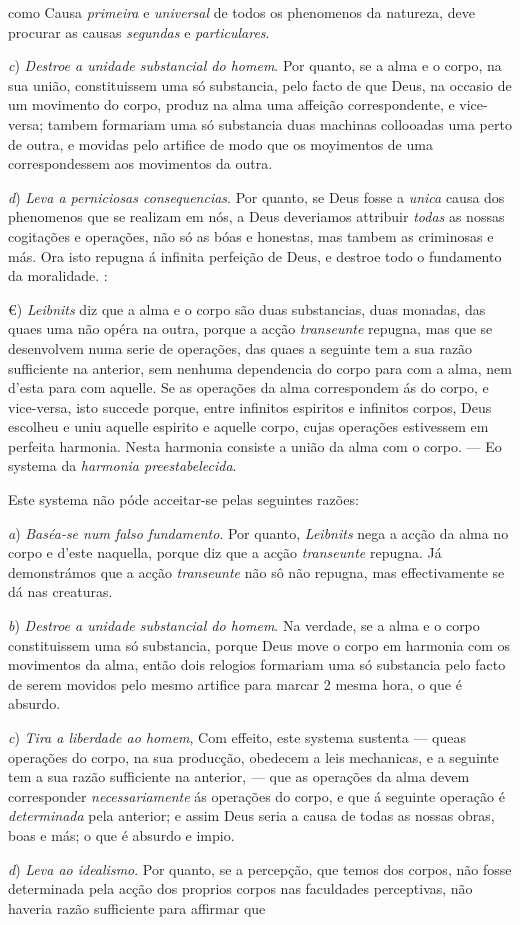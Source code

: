 como Causa \emph{primeira} e \emph{universal} de todos os phenomenos da natureza, deve procurar as causas \emph{segundas} e \emph{particulares}.\par \emph{c}) \emph{Destroe a unidade substancial do homem}. Por quanto, se a alma e o corpo, na sua união, constituissem uma só substancia, pelo facto de que Deus, na occasio de um movimento do corpo, produz na alma uma affeição correspondente, e vice-versa; tambem formariam uma só substancia duas machinas collooadas uma perto de outra, e movidas pelo artifice de modo que os moyimentos de uma correspondessem aos movimentos da outra.\par \emph{d}) \emph{Leva a perniciosas consequencias}. Por quanto, se Deus fosse a \emph{unica} causa dos phenomenos que se realizam em nós, a Deus deveriamos attribuir \emph{todas} as nossas cogitações e operações, não só as bóas e honestas, mas tambem as criminosas e más. Ora isto repugna á infinita perfeição de Deus, e destroe todo o fundamento da moralidade. :\par €) \emph{Leibnits} diz que a alma e o corpo são duas substancias, duas monadas, das quaes uma não opéra na outra, porque a acção \emph{transeunte} repugna, mas que se desenvolvem numa serie de operações, das quaes a seguinte tem a sua razão sufficiente na anterior, sem nenhuma dependencia do corpo para com a alma, nem d'esta para com aquelle. Se as operações da alma correspondem ás do corpo, e vice-versa, isto succede porque, entre infinitos espiritos e infinitos corpos, Deus escolheu e uniu aquelle espirito e aquelle corpo, cujas operações estivessem em perfeita harmonia. Nesta harmonia consiste a união da alma com o corpo. --- Eo systema da \emph{harmonia preestabelecida}.\par Este systema não póde acceitar-se pelas seguintes razões:\par \emph{a}) \emph{Baséa-se num falso fundamento}. Por quanto, \emph{Leibnits} nega a acção da alma no corpo e d'este naquella, porque diz que a acção \emph{transeunte} repugna. Já demonstrámos que a acção \emph{transeunte} não sô não repugna, mas effectivamente se dá nas creaturas.\par \emph{b}) \emph{Destroe a unidade substancial do homem}. Na verdade, se a alma e o corpo constituissem uma só substancia, porque Deus move o corpo em harmonia com os movimentos da alma, então dois relogios formariam uma só substancia pelo facto de serem movidos pelo mesmo artifice para marcar 2 mesma hora, o que é absurdo.\par \emph{c}) \emph{Tira a liberdade ao homem}, Com effeito, este systema sustenta --- queas operações do corpo, na sua producção, obedecem a leis mechanicas, e a seguinte tem a sua razão sufficiente na anterior, --- que as operações da alma devem corresponder \emph{necessariamente} ás operações do corpo, e que á seguinte operação é \emph{determinada} pela anterior; e assim Deus seria a causa de todas as nossas obras, boas e más; o que é absurdo e impio.\par \emph{d}) \emph{Leva ao idealismo}. Por quanto, se a percepção, que temos dos corpos, não fosse determinada pela acção dos proprios corpos nas faculdades perceptivas, não haveria razão sufficiente para affirmar que 